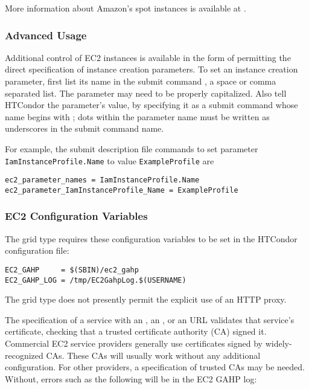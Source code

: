 More information about Amazon's spot instances is available at
.

\subsubsection{\label{sec:Amazon-parameters}Advanced Usage}

Additional control of EC2 instances is available in the form
of permitting the
direct specification of instance creation parameters.  
To set an instance creation parameter, 
first list its name in the submit command ,
a space or comma separated list.  
The parameter may need to be properly capitalized.  
Also tell HTCondor the parameter's value, 
by specifying it as a submit command whose name begins with
; dots within the parameter name must be
written as underscores in the submit command name.

For example, the submit description file commands
to set parameter \texttt{IamInstanceProfile.Name} 
to value \texttt{ExampleProfile} are

\begin{verbatim}
ec2_parameter_names = IamInstanceProfile.Name
ec2_parameter_IamInstanceProfile_Name = ExampleProfile
\end{verbatim}

\subsubsection{\label{sec:Amazon-config}EC2 Configuration Variables}

The  grid type requires these configuration variables 
to be set in the HTCondor configuration file:

\footnotesize
\begin{verbatim}
EC2_GAHP     = $(SBIN)/ec2_gahp
EC2_GAHP_LOG = /tmp/EC2GahpLog.$(USERNAME)
\end{verbatim}
\normalsize

The  grid type does not presently permit the explicit use 
of an HTTP proxy.

The specification of a service with an , an ,
or an  URL validates that service's certificate,
checking that a trusted certificate authority (CA) signed it.
Commercial EC2 service providers generally use certificates signed by 
widely-recognized CAs.
These CAs will usually work without any additional configuration.  
For other providers, a specification of trusted CAs may be needed.
Without, errors such as the following will be in the EC2 GAHP log:

